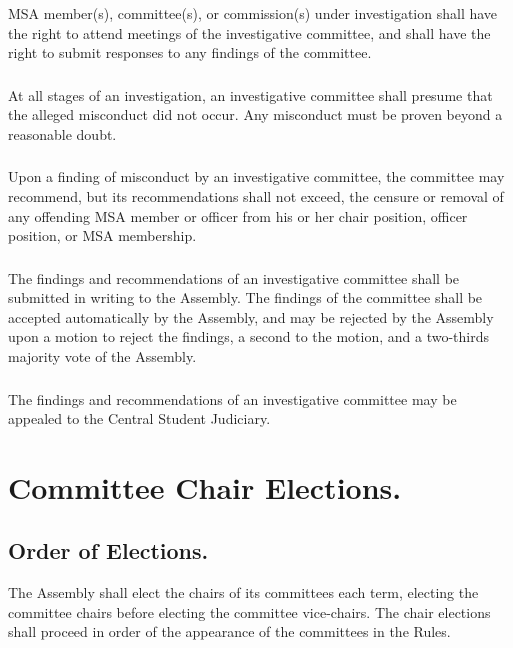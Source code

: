 \documentclass{rules}
\begin{document}
\subsubsection{}
MSA member(s), committee(s), or commission(s) under investigation shall have the right to attend meetings of the investigative committee, and shall have the right to submit responses to any findings of the committee.
\subsubsection{}
At all stages of an investigation, an investigative committee shall presume that the alleged misconduct did not occur.  Any misconduct must be proven beyond a reasonable doubt.
\subsubsection{}
Upon a finding of misconduct by an investigative committee, the committee may recommend, but its recommendations shall not exceed, the censure or removal of any offending MSA member or officer from his or her chair position, officer position, or MSA membership.
\subsubsection{}
The findings and recommendations of an investigative committee shall be submitted in writing to the Assembly.  The findings of the committee shall be accepted automatically by the Assembly, and may be rejected by the Assembly upon a motion to reject the findings, a second to the motion, and a two-thirds majority vote of the Assembly.
\subsubsection{}
The findings and recommendations of an investigative committee may be appealed to the Central Student Judiciary.


\section{Committee Chair Elections.}
\subsection{Order of Elections.}
The Assembly shall elect the chairs of its committees each term, electing the committee chairs before electing the committee vice-chairs.  The chair elections shall proceed in order of the appearance of the committees in the Rules.
\end{document}
